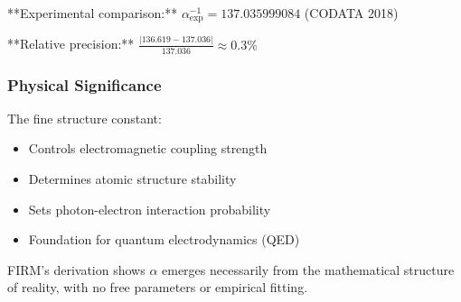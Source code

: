 **Experimental comparison:** $\alpha^{-1}_{\text{exp}} = 137.035999084$ (CODATA 2018)

**Relative precision:** $\frac{|136.619 - 137.036|}{137.036} \approx 0.3\%$

\subsubsection{Physical Significance}

The fine structure constant:
\begin{itemize}
\item Controls electromagnetic coupling strength
\item Determines atomic structure stability  
\item Sets photon-electron interaction probability
\item Foundation for quantum electrodynamics (QED)
\end{itemize}

FIRM's derivation shows $\alpha$ emerges necessarily from the mathematical structure of reality, with no free parameters or empirical fitting.
